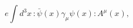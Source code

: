 \begin{equation}
e \int d^3x\, : \bar{\psi}(x)\gamma_\mu \psi(x) : A^\mu(x), \label{4-11}
\end{equation}

